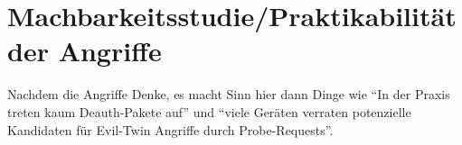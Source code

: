 \section{Machbarkeitsstudie/Praktikabilität der Angriffe}
Nachdem die Angriffe 
Denke, es macht Sinn hier dann Dinge wie \enquote{In der Praxis treten kaum Deauth-Pakete auf} und \enquote{viele Geräten verraten potenzielle Kandidaten für Evil-Twin Angriffe durch Probe-Requests}.